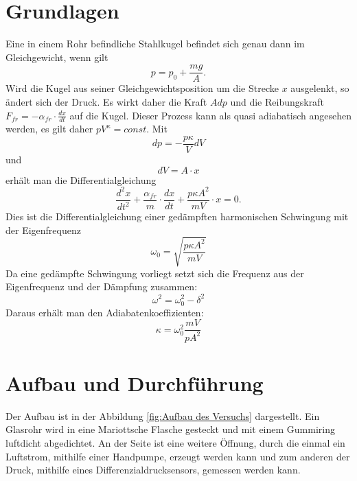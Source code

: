 \documentclass[a4paper, 11pt]{article}
\begin{document}
\section{Grundlagen}
Eine in einem Rohr befindliche Stahlkugel befindet sich genau dann im Gleichgewicht, wenn gilt
\begin{equation}
p = p_0 + \frac{mg}{A}.
\end{equation}
Wird die Kugel aus seiner Gleichgewichtsposition um die Strecke $x$ ausgelenkt, so ändert sich der Druck. Es wirkt daher die Kraft $Adp$ und die Reibungskraft $F_{fr} = -\alpha_{fr} \cdot \frac{dx}{dt}$ auf die Kugel. Dieser Prozess kann als quasi adiabatisch angesehen werden, es gilt daher $pV^{\kappa} = const$. Mit 
\begin{equation}
dp = -\frac{p\kappa}{V} dV
\end{equation}
und
\begin{equation}
dV = A \cdot x
\end{equation}
erhält man die Differentialgleichung 
\begin{equation}
\frac{d^2x}{dt^2} + \frac{\alpha_{fr}}{m} \cdot \frac{dx}{dt} + \frac{p \kappa A^2}{mV} \cdot x = 0.
\end{equation}
Dies ist die Differentialgleichung einer gedämpften harmonischen Schwingung mit der Eigenfrequenz
\begin{equation}
\omega_0 = \sqrt{\frac{p \kappa A^2}{mV}}
\end{equation}
Da eine gedämpfte Schwingung vorliegt setzt sich die Frequenz aus der Eigenfrequenz und der Dämpfung zusammen:
\begin{equation}\label{eq:omega}
\omega^2 = \omega_0^2 - \delta^2
\end{equation}
Daraus erhält man den Adiabatenkoeffizienten: 
\begin{equation}
\kappa = \omega_0^2 \frac{mV}{pA^2}
\end{equation}


\clearpage
\section{Aufbau und Durchführung}
Der Aufbau ist in der Abbildung \ref{fig:Aufbau des Versuchs} dargestellt. Ein Glasrohr wird in eine Mariottsche Flasche gesteckt und mit einem Gummiring luftdicht abgedichtet. An der Seite ist eine weitere Öffnung, durch die einmal ein Luftstrom, mithilfe einer Handpumpe, erzeugt werden kann und zum anderen der Druck, mithilfe eines Differenzialdrucksensors, gemessen werden kann.
\end{document}
